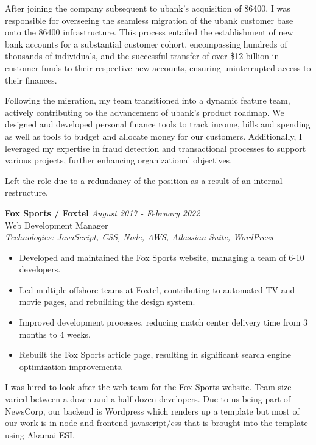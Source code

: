 \documentclass[a4paper,10pt]{article}
\begin{document}
After joining the company subsequent to ubank's acquisition of 86400, I was responsible for overseeing the seamless migration of the ubank customer base onto the 86400 infrastructure. This process entailed the establishment of new bank accounts for a substantial customer cohort, encompassing hundreds of thousands of individuals, and the successful transfer of over \$12 billion in customer funds to their respective new accounts, ensuring uninterrupted access to their finances.

Following the migration, my team transitioned into a dynamic feature team, actively contributing to the advancement of ubank's product roadmap. We designed and developed personal finance tools to track income, bills and spending as well as tools to budget and allocate money for our customers. Additionally, I leveraged my expertise in fraud detection and transactional processes to support various projects, further enhancing organizational objectives.

Left the role due to a redundancy of the position as a result of an internal restructure.

\vspace{1em}

\textbf{Fox Sports / Foxtel} \hfill \textit{August 2017 - February 2022} \\
Web Development Manager \\
\textit{Technologies: JavaScript, CSS, Node, AWS, Atlassian Suite, WordPress}
\begin{itemize}
    \item Developed and maintained the Fox Sports website, managing a team of 6-10 developers.
    \item Led multiple offshore teams at Foxtel, contributing to automated TV and movie pages, and rebuilding the design system.
    \item Improved development processes, reducing match center delivery time from 3 months to 4 weeks.
    \item Rebuilt the Fox Sports article page, resulting in significant search engine optimization improvements.
\end{itemize}

I was hired to look after the web team for the Fox Sports website. Team size varied between a dozen and a half dozen developers. Due to us being part of NewsCorp, our backend is Wordpress which renders up a template but most of our work is in node and frontend javascript/css that is brought into the template using Akamai ESI.
\end{document}
